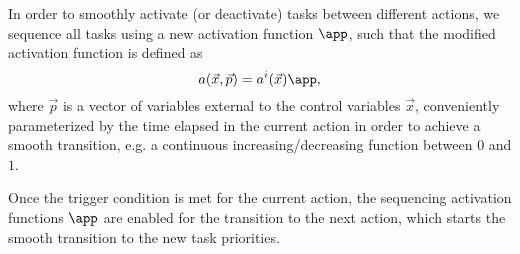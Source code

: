 \begin{parts}
\begin{solutionorbox}
			In order to smoothly activate (or deactivate) tasks
			between different actions, we sequence all tasks using a
			new activation function $\app$, such that the modified
			activation function is defined as \[
				a(\vec x, \vec p) = a^i(\vec x) \app
				\mathrm{,}
			\] where $\vec p$ is a vector of variables external to
			the control variables $\vec x$, conveniently
			parameterized by the time elapsed in the current action
			in order to achieve a smooth transition, e.g. a
			continuous increasing/decreasing function between
			$0$ and $1$.

			Once the trigger condition is met for the current
			action, the sequencing activation functions $\app$ are
			enabled for the transition to the next action, which
			starts the smooth transition to the new task priorities.

		\end{solutionorbox}
	\end{parts}
